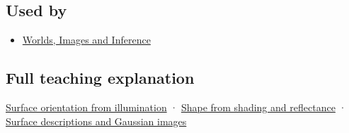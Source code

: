\subsection{Used by}\label{used-by}

\begin{itemize}
\tightlist
\item
  \href{Continuous\%20Notes/University\%20-\%20Worlds,\%20Images\%20and\%20Inference\%20-\%20Graphics,\%20Vision\%20and\%20Photography}{Worlds, Images and Inference}
\end{itemize}

\subsection{Full teaching explanation}\label{full-teaching-explanation}

\href{Continuous\%20Notes/University\%20-\%20Worlds,\%20Images\%20and\%20Inference\%20-\%20Graphics,\%20Vision\%20and\%20Photography\#Surface\%20orientation\%20from\%20illumination}{Surface orientation from illumination} · \href{Continuous\%20Notes/University\%20-\%20Worlds,\%20Images\%20and\%20Inference\%20-\%20Graphics,\%20Vision\%20and\%20Photography\#Shape\%20from\%20shading\%20and\%20reflectance}{Shape from shading and reflectance} · \href{Continuous\%20Notes/University\%20-\%20Worlds,\%20Images\%20and\%20Inference\%20-\%20Graphics,\%20Vision\%20and\%20Photography\#Surface\%20descriptions\%20and\%20Gaussian\%20images}{Surface descriptions and Gaussian images}
